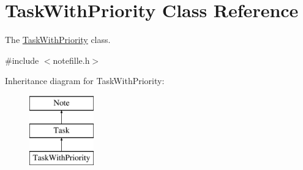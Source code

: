 \hypertarget{classTaskWithPriority}{}\section{Task\+With\+Priority Class Reference}
\label{classTaskWithPriority}


The \hyperlink{classTaskWithPriority}{Task\+With\+Priority} class.  




{\ttfamily \#include $<$notefille.\+h$>$}

Inheritance diagram for Task\+With\+Priority\+:\begin{figure}[H]
\begin{center}
\leavevmode
\includegraphics[height=3.000000cm]{classTaskWithPriority}
\end{center}
\end{figure}
